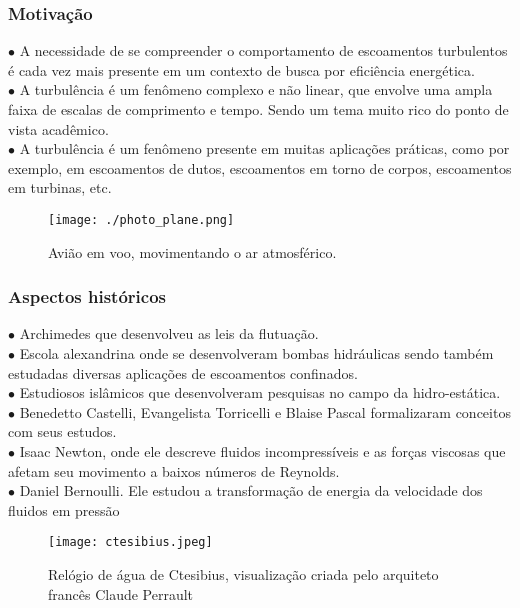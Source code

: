 \documentclass[xcolor=dvipsnames,10pt,aspectratio=169]{beamer}
\begin{document}
	
		\begin{frame}
      \frametitle{Motivação}
      \begin{minipage}[h!]{0.49\textwidth}
			$\bullet$ A necessidade de se compreender o comportamento de escoamentos turbulentos é cada vez mais presente em um contexto de busca por eficiência energética.\\ 
      $\bullet$ A turbulência é um fenômeno complexo e não linear, que envolve uma ampla faixa de escalas de comprimento e tempo. Sendo um tema muito rico do ponto de vista acadêmico.\\
      $\bullet$ A turbulência é um fenômeno presente em muitas aplicações práticas, como por exemplo, em escoamentos de dutos, escoamentos em torno de corpos, escoamentos em turbinas, etc.\\
      \end{minipage}
      \begin{minipage}[h!]{0.49\textwidth}
        \begin{figure}[h!]
          \texttt{[image: ./photo\_plane.png]}
          \caption{\label{image:plane} Avião em voo, movimentando o ar atmosférico.}
        \end{figure}
      \end{minipage}
		\end{frame}

		\begin{frame}
      \frametitle{Aspectos históricos}
      \begin{minipage}[h!]{0.49\textwidth}
			$\bullet$ Archimedes que desenvolveu as leis da flutuação.\\ 
      $\bullet$ Escola alexandrina onde se desenvolveram bombas hidráulicas sendo também estudadas diversas aplicações de escoamentos confinados.\\
      $\bullet$ Estudiosos islâmicos que desenvolveram pesquisas no campo da hidro-estática.\\
      $\bullet$ Benedetto Castelli, Evangelista Torricelli e Blaise Pascal formalizaram conceitos com seus estudos.\\
      $\bullet$ Isaac Newton, onde ele descreve fluidos incompressíveis e as forças viscosas que afetam seu movimento a baixos números de Reynolds.\\
      $\bullet$ Daniel Bernoulli. Ele estudou a transformação de energia da velocidade dos fluidos em pressão

      \end{minipage}
      \begin{minipage}[h!]{0.49\textwidth}
        \begin{figure}[h!]
          \texttt{[image: ctesibius.jpeg]}
          \caption{\label{image:ctesibius} Relógio de água de Ctesibius, visualização criada pelo arquiteto francês Claude Perrault}
        \end{figure}
      \end{minipage}
		\end{frame}
\end{document}
